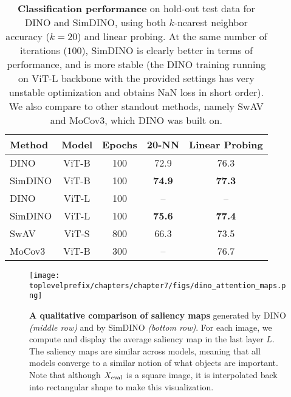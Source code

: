 \documentclass[\toplevelprefix/book-main.tex]{subfiles}
\begin{document}
\begin{table}
    \centering
    \begin{tabular}{@{}lcccc@{}} %
        \toprule
        Method & Model & Epochs & 20-NN & Linear Probing 
        \\
        \midrule 
        DINO & ViT-B & 100 & 72.9 & 76.3 \\
        SimDINO & ViT-B & 100 & \bf 74.9 & \bf 77.3 \\
        DINO & ViT-L & 100 & -- & -- \\
        SimDINO & ViT-L & 100 & \bf 75.6 & \bf 77.4 \\
        \midrule
        \color{gray} SwAV & \color{gray} ViT-S & \color{gray} 800 & \color{gray} 66.3 & \color{gray} 73.5 \\
        \color{gray} MoCov3 & \color{gray} ViT-B & \color{gray} 300  & \color{gray} -- & \color{gray} 76.7 \\
        \bottomrule
    \end{tabular}
    \caption{\small\textbf{Classification performance} on hold-out test data for DINO and SimDINO, using both \(k\)-nearest neighbor accuracy (\(k = 20\)) and linear probing. At the same number of iterations (\(100\)), SimDINO is clearly better in terms of performance, and is more stable (the DINO training running on ViT-L backbone with the provided settings has very unstable optimization and obtains NaN loss in short order). We also compare to other standout methods, namely SwAV and MoCov3, which DINO was built on.}
    \label{tab:dino_imagenet_linear_probing}
\end{table}

\begin{figure}
    \centering 
    \texttt{[image: \\toplevelprefix/chapters/chapter7/figs/dino\_attention\_maps.png]}
    \caption{\small\textbf{A qualitative comparison of saliency maps} generated by DINO \textit{(middle row)} and by SimDINO \textit{(bottom row)}. For each image, we compute and display the average saliency map in the last layer \(L\). The saliency maps are similar across models, meaning that all models converge to a similar notion of what objects are important. Note that although \(X_{\mathrm{eval}}\) is a square image, it is interpolated back into rectangular shape to make this visualization.}
    \label{fig:dino_attention_maps_saliency}
\end{figure}
\end{document}
